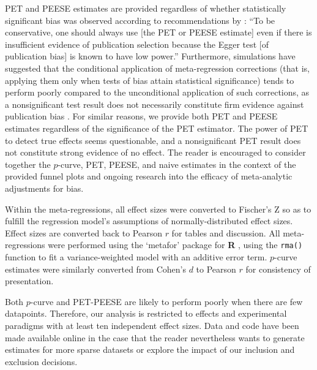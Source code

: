 \documentclass[man]{apa6}
\begin{document}
PET and PEESE estimates are provided regardless of whether statistically significant bias was observed according to recommendations by \citet[p. 20-21]{Stanley:Doucouliagos:2013}: ``To be conservative, one should always use [the PET or PEESE estimate] even if there is insufficient evidence of publication selection because the Egger test [of publication bias] is known to have low power.'' Furthermore, simulations have suggested that the conditional application of meta-regression corrections (that is, applying them only when tests of bias attain statistical significance) tends to perform poorly compared to the unconditional application of such corrections, as a nonsignificant test result does not necessarily constitute firm evidence against publication bias \citep{Moreno:etal:2006}. For similar reasons, we provide both PET and PEESE estimates regardless of the significance of the PET estimator. The power of PET to detect true effects seems questionable, and a nonsignificant PET result does not constitute strong evidence of no effect. The reader is encouraged to consider together the $p$-curve, PET, PEESE, and naive estimates in the context of the provided funnel plots and ongoing research into the efficacy of meta-analytic adjustments for bias.

Within the meta-regressions, all effect sizes were converted to Fischer's Z so as to fulfill the regression model's assumptions of normally-distributed effect sizes. Effect sizes are converted back to Pearson $r$ for tables and discussion. All meta-regressions were performed using the `metafor' package for {\bf R} \citep{Viechtbauer:2010}, using the {\tt rma()} function to fit a variance-weighted model with an additive error term. $p$-curve estimates were similarly converted from Cohen's $d$ to Pearson $r$ for consistency of presentation.

Both $p$-curve and PET-PEESE are likely to perform poorly when there are few datapoints. Therefore, our analysis is restricted to effects and experimental paradigms with at least ten independent effect sizes. %
Data and code have been made available online in the case that the reader nevertheless wants to generate estimates for more sparse datasets or explore the impact of our inclusion and exclusion decisions. %
\end{document}
